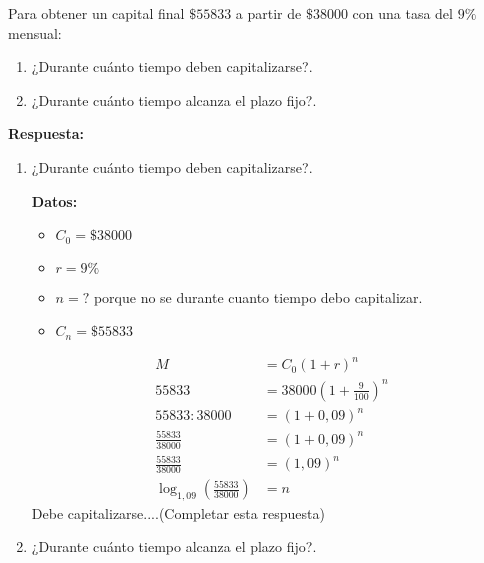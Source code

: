 \documentclass[12pt]{examdesign}
\theoremstyle{plain}
\theoremstyle{definition}
\theoremstyle{remark}
\begin{document}
\begin{shortanswer}[title={Leemos el material de consulta y realizamos las actividades propuestas.}, rearrange=no]
        \begin{question}
        	Para obtener un capital final $\$55833$ a partir de $\$38000$ con una tasa del $9\%$ mensual:	
        	\begin{enumerate}
        		\item ¿Durante cuánto tiempo deben capitalizarse?.
        		\item ¿Durante cuánto tiempo alcanza el plazo fijo?.
        	\end{enumerate}
        	\begin{answer}
        		\textbf{Respuesta:}
        		\begin{enumerate}
        			\item ¿Durante cuánto tiempo deben capitalizarse?.
        			
        			\textbf{Datos:}
        			
        			\begin{itemize}
        				\item $C_{0}=\$38000$
        				\item $r=9\%$
        				\item $n=?$ porque no se durante cuanto tiempo debo capitalizar.
        				\item $C_{n}=\$55833$
        			\end{itemize}
        			
        			\begin{align*}
        				M                                          &=C_{0}(1+r)^{n}                        \\
        				55833                                      &=38000\left(1+\frac{9}{100}\right)^{n} \\
        				55833:38000                                &=\left(1+0,09\right)^{n}               \\
        				\frac{55833}{38000}                        &=\left(1+0,09\right)^{n}               \\
        				\frac{55833}{38000}                        &=\left(1,09\right)^{n}                 \\
        				\log_{1,09}\left(\frac{55833}{38000}\right)&=n
        			\end{align*}
        		Debe capitalizarse....(Completar esta respuesta)
        			
        			\item ¿Durante cuánto tiempo alcanza el plazo fijo?.
        			

\end{enumerate}
\end{answer}
\end{question}
\end{shortanswer}
\end{document}
